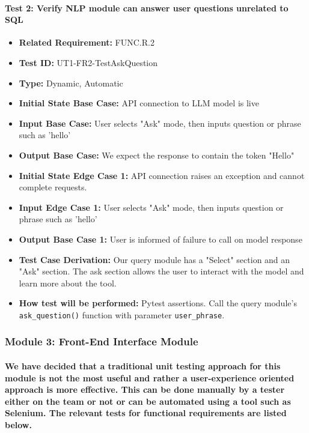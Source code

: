 \documentclass[12pt, titlepage]{article}
\begin{document}
\begin{flushleft}
\paragraph{Test 2: Verify NLP module can answer user questions unrelated to SQL}
\begin{itemize}
    \item \textbf{Related Requirement:} FUNC.R.2
    \item \textbf{Test ID:} UT1-FR2-TestAskQuestion
    \item \textbf{Type:} Dynamic, Automatic
    \item \textbf{Initial State Base Case:} API connection to LLM model is live
    \item \textbf{Input Base Case:} User selects "Ask" mode, then inputs question or phrase such as 'hello'
    \item \textbf{Output Base Case:} We expect the response to contain the token "Hello"
    \item \textbf{Initial State Edge Case 1:} API connection raises an exception and cannot complete requests.
    \item \textbf{Input Edge Case 1:} User selects "Ask" mode, then inputs question or phrase such as 'hello'
    \item \textbf{Output Base Case 1:} User is informed of failure to call on model response
    \item \textbf{Test Case Derivation:} Our query module has a "Select" section and an "Ask" section. The ask section allows the user to interact with the model and learn more about the tool.
    \item \textbf{How test will be performed:} Pytest assertions. Call the query module's \texttt{ask\_question()} function with parameter \texttt{user\_phrase}.
\end{itemize}

\subsubsection{Module 3: Front-End Interface Module}

\paragraph{We have decided that a traditional unit testing approach for this module
is not the most useful and rather a user-experience oriented approach is more effective.
This can be done manually by a tester either on the team or not or can be automated using
a tool such as Selenium. The relevant tests for functional requirements are listed below.}


\end{flushleft}
\end{document}
